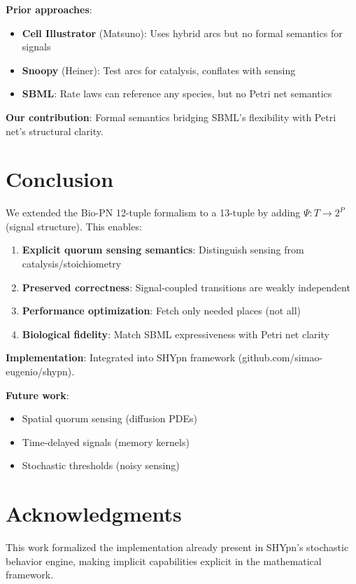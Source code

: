 \documentclass[11pt]{article}
\begin{document}
\textbf{Prior approaches}:
\begin{itemize}
    \item \textbf{Cell Illustrator} (Matsuno): Uses hybrid arcs but no formal semantics for signals
    \item \textbf{Snoopy} (Heiner): Test arcs for catalysis, conflates with sensing
    \item \textbf{SBML}: Rate laws can reference any species, but no Petri net semantics
\end{itemize}

\textbf{Our contribution}: Formal semantics bridging SBML's flexibility with Petri net's structural clarity.

\section{Conclusion}

We extended the Bio-PN 12-tuple formalism to a 13-tuple by adding $\Psi: T \to 2^P$ (signal structure). This enables:

\begin{enumerate}
    \item \textbf{Explicit quorum sensing semantics}: Distinguish sensing from catalysis/stoichiometry
    \item \textbf{Preserved correctness}: Signal-coupled transitions are weakly independent
    \item \textbf{Performance optimization}: Fetch only needed places (not all)
    \item \textbf{Biological fidelity}: Match SBML expressiveness with Petri net clarity
\end{enumerate}

\textbf{Implementation}: Integrated into SHYpn framework (github.com/simao-eugenio/shypn).

\textbf{Future work}: 
\begin{itemize}
    \item Spatial quorum sensing (diffusion PDEs)
    \item Time-delayed signals (memory kernels)
    \item Stochastic thresholds (noisy sensing)
\end{itemize}

\section*{Acknowledgments}

This work formalized the implementation already present in SHYpn's stochastic behavior engine, making implicit capabilities explicit in the mathematical framework.
\end{document}

